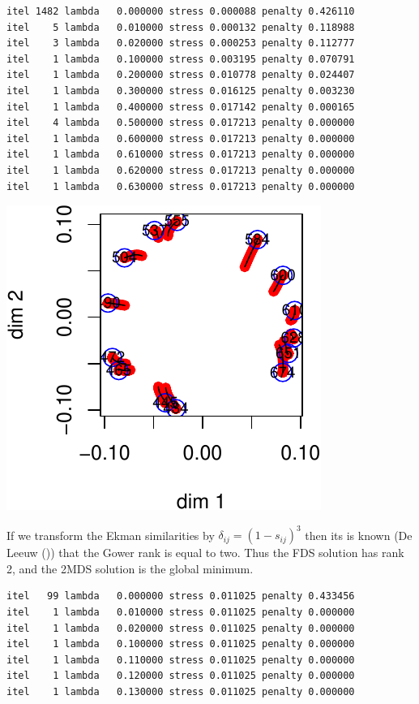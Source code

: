 \documentclass[
  12pt,
  letterpaper,
  DIV=11,
  numbers=noendperiod]{scrreprt}
\theoremstyle{remark}
\begin{document}
\begin{verbatim}
itel 1482 lambda   0.000000 stress 0.000088 penalty 0.426110 
itel    5 lambda   0.010000 stress 0.000132 penalty 0.118988 
itel    3 lambda   0.020000 stress 0.000253 penalty 0.112777 
itel    1 lambda   0.100000 stress 0.003195 penalty 0.070791 
itel    1 lambda   0.200000 stress 0.010778 penalty 0.024407 
itel    1 lambda   0.300000 stress 0.016125 penalty 0.003230 
itel    1 lambda   0.400000 stress 0.017142 penalty 0.000165 
itel    4 lambda   0.500000 stress 0.017213 penalty 0.000000 
itel    1 lambda   0.600000 stress 0.017213 penalty 0.000000 
itel    1 lambda   0.610000 stress 0.017213 penalty 0.000000 
itel    1 lambda   0.620000 stress 0.017213 penalty 0.000000 
itel    1 lambda   0.630000 stress 0.017213 penalty 0.000000 
\end{verbatim}

\begin{center}
\includegraphics{global_files/figure-pdf/ekman_global-1.pdf}
\end{center}

If we transform the Ekman similarities by \(\delta_{ij}=(1-s_{ij})^3\)
then its is known (De Leeuw ()) that
the Gower rank is equal to two. Thus the FDS solution has rank 2, and
the 2MDS solution is the global minimum.

\begin{verbatim}
itel   99 lambda   0.000000 stress 0.011025 penalty 0.433456 
itel    1 lambda   0.010000 stress 0.011025 penalty 0.000000 
itel    1 lambda   0.020000 stress 0.011025 penalty 0.000000 
itel    1 lambda   0.100000 stress 0.011025 penalty 0.000000 
itel    1 lambda   0.110000 stress 0.011025 penalty 0.000000 
itel    1 lambda   0.120000 stress 0.011025 penalty 0.000000 
itel    1 lambda   0.130000 stress 0.011025 penalty 0.000000 
\end{verbatim}
\end{document}

